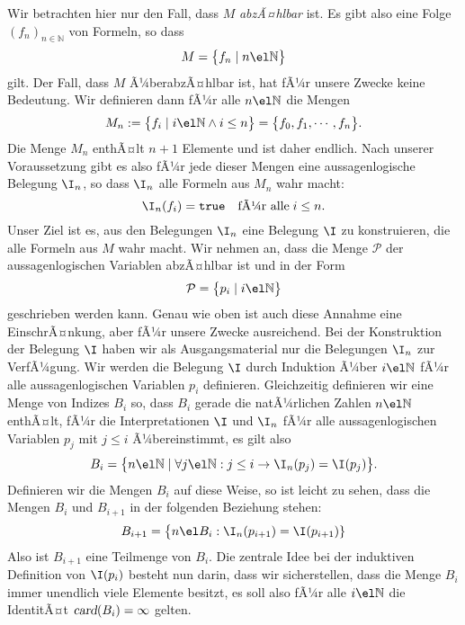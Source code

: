 Wir betrachten hier nur den Fall, dass $M$ \emph{abzÃ¤hlbar} ist.  Es gibt also eine
Folge $(f_n)_{n\in\mathbb{N}}$ von Formeln, so dass 
\[ M = \bigl\{ f_n \mid n \el \mathbb{N} \bigr\} \]
gilt.  Der Fall, dass $M$ Ã¼berabzÃ¤hlbar ist, hat fÃ¼r unsere Zwecke keine Bedeutung.
Wir definieren dann fÃ¼r alle $n \el \mathbb{N}$ die Mengen 
\[ M_n := \bigl\{ f_i \mid i \el\mathbb{N} \wedge i \leq n \bigr\} 
          = \bigl\{ f_0, f_1,\cdots, f_n \bigr\}. 
\] 
Die Menge $M_n$ enthÃ¤lt $n+1$ Elemente und ist daher endlich.  
Nach unserer Voraussetzung gibt es also fÃ¼r jede
dieser Mengen eine aussagenlogische Belegung $\I_n$, so dass $\I_n$ alle Formeln aus
$M_n$ wahr macht:
\[ \I_n(f_i) = \mathtt{true} \quad \mbox{fÃ¼r alle}\; i\leq n. \]
Unser Ziel ist es, aus den Belegungen $\I_n$ eine Belegung $\I$ zu konstruieren, die
alle Formeln aus $M$ wahr macht.  Wir nehmen an, dass die Menge $\mathcal{P}$ der
aussagenlogischen Variablen abzÃ¤hlbar ist und in der Form 
\[ \mathcal{P} = \bigl\{ p_i \mid i \el \mathbb{N} \bigr\} \]
geschrieben werden kann.  Genau wie oben ist auch diese Annahme eine EinschrÃ¤nkung, aber
fÃ¼r unsere Zwecke ausreichend.  
Bei der Konstruktion der Belegung $\I$ haben wir als Ausgangsmaterial nur die Belegungen
$\I_n$ zur VerfÃ¼gung.  Wir werden die Belegung $\I$ durch
Induktion Ã¼ber $i \el \mathbb{N}$ fÃ¼r alle aussagenlogischen Variablen $p_i$ definieren.
Gleichzeitig definieren wir eine Menge von Indizes $B_i$ so, dass $B_i$ 
gerade die natÃ¼rlichen Zahlen $n \el \mathbb{N}$ enthÃ¤lt, fÃ¼r die Interpretationen $\I$ und $\I_n$ fÃ¼r alle
aussagenlogischen Variablen $p_j$ mit $j \leq i$ Ã¼bereinstimmt, es gilt also
\[ B_i = \bigl\{ n \el \mathbb{N} \mid 
                \forall j \el \mathbb{N} : j \leq i \rightarrow \I_n(p_j) = \I(p_j) \bigr\}.
\]
Definieren wir die Mengen $B_i$ auf diese Weise, so ist leicht zu sehen,
dass die Mengen $B_i$ und $B_{i+1}$ in der folgenden Beziehung stehen:
\[
  B_{i+1} = \bigl\{ n \el B_i :  \I_n(p_{i+1}) = \I(p_{i+1}) \}
\]
Also ist $B_{i+1}$  eine Teilmenge von $B_i$.
Die zentrale Idee bei der induktiven Definition von $\I(p_i)$ besteht nun darin,
dass wir sicherstellen, dass die Menge $B_i$ immer unendlich viele Elemente besitzt,
es soll also fÃ¼r alle $i\el \mathbb{N}$ die IdentitÃ¤t $\textsl{card}(B_i) = \infty$ gelten.
